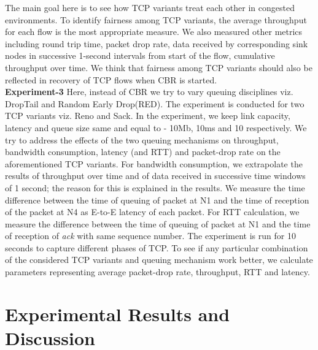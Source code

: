 \documentclass[USenglish,oneside,twocolumn]{article}
\begin{document}
The main goal here is to see how TCP variants treat each other in congested environments. To identify fairness among TCP variants, the average throughput for each flow is the most appropriate measure. We also measured other metrics including round trip time, packet drop rate, data received by corresponding sink nodes in successive 1-second intervals from start of the flow, cumulative throughput over time. We think that fairness among TCP variants should also be reflected in recovery of TCP flows when CBR is started.\\
\noindent \textbf{Experiment-3}
Here, instead of CBR we try to vary queuing disciplines viz. DropTail and Random Early Drop(RED). The experiment is conducted for two TCP variants viz. Reno and Sack. In the experiment, we keep link capacity, latency and queue size same and equal to - 10Mb, 10ms and 10 respectively. We try to address the effects of the two queuing mechanisms on throughput, bandwidth consumption, latency (and RTT) and packet-drop rate on the aforementioned TCP variants. For bandwidth consumption, we extrapolate the results of throughput over time and of data received in successive time windows of 1 second; the reason for this is explained in the results. We measure the time difference between the time of queuing of packet at N1 and the time of reception of the packet at N4 as E-to-E latency of each packet. For RTT calculation, we measure the difference between the time of queuing of packet at N1 and the time of reception of \textit{ack} with same sequence number. The experiment is run for 10 seconds to capture different phases of TCP. To see if any particular combination of the considered TCP variants and queuing mechanism work better, we calculate parameters representing average packet-drop rate, throughput, RTT and latency.
\section{Experimental Results and Discussion}
\end{document}
